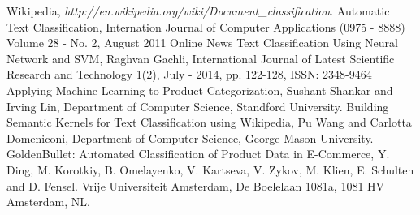 \documentclass[12pt]{book}
\begin{document}
\begin{thebibliography}{12}
	  Wikipedia,
	  \emph {http://en.wikipedia.org/wiki/Document\_classification}.
	  Automatic Text Classification,
	  Internation Journal of Computer Applications (0975 - 8888)
	  Volume 28 - No. 2, August 2011
	  Online News Text Classification Using Neural Network and SVM,
	  Raghvan Gachli, International Journal of Latest Scientific Research and Technology 1(2), July - 2014, pp. 122-128, ISSN: 2348-9464
	  Applying Machine Learning to Product Categorization,
	  Sushant Shankar and Irving Lin,
	  Department of Computer Science, Standford University.
	  Building Semantic Kernels for Text Classification using Wikipedia,
	  Pu Wang and Carlotta Domeniconi,
	  Department of Computer Science, George Mason University.
	  GoldenBullet: Automated Classification of Product Data in E-Commerce,
	  Y. Ding, M. Korotkiy, B. Omelayenko, V. Kartseva, V. Zykov, M. Klien, E. Schulten and D. Fensel.
	  Vrije Universiteit Amsterdam, De Boelelaan 1081a, 1081 HV Amsterdam, NL.
\end{thebibliography} %
\end{document}
